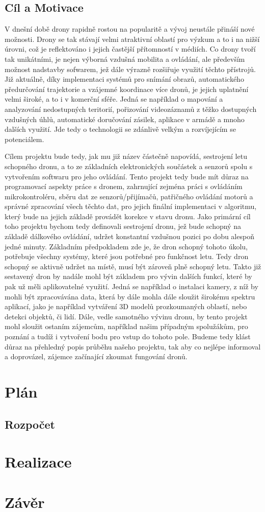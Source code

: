 \documentclass[12pt]{report}
\begin{document}
\section{Cíl a Motivace}
V dnešní době drony rapidně rostou na popularitě a vývoj neustále přináší nové možnosti. Drony se tak stávají velmi atraktivní oblastí pro výzkum a to i na nižší úrovni, což je reflektováno i jejich častější přítomností v médiích. Co drony tvoří tak unikátními, je nejen výborná vzdušná mobilita a ovládání, ale především možnost nadstavby sofwarem, jež dále výrazně rozšiřuje využití těchto přístrojů. Již aktuálně, díky implementaci systémů pro snímání obrazů, automatického předurčování trajektorie a vzájemné koordinace více dronů, je jejich uplatnění velmi široké, a to i v komerční sféře. Jedná se například o mapování a analyzování nedostupných teritorií, pořizování videozáznamů z těžko dostupných vzdušných úhlů, automatické doručování zásilek, aplikace v armádě a mnoho dalších využití. Jde tedy o technologii se zdánlivě velkým a rozvíjejícím se potenciálem.  \par 
Cílem projektu bude tedy, jak mu již název částečně napovídá, sestrojení letu schopného dronu, a to ze základních elektronických součástek a senzorů spolu s vytvořením softwaru pro jeho ovládání. Tento projekt tedy bude mít důraz na programovací aspekty práce s dronem, zahrnující zejména práci s ovládáním mikrokontroléru, sběru dat ze senzorů/přijímačů, patřičného ovládání motorů a správné zpracování všech těchto dat, pro jejich finální implementaci v algoritmu, který bude na jejich základě provádět korekce v stavu dronu. Jako primární cíl toho projektu bychom tedy definovali sestrojení dronu, jež bude schopný na základě dálkového ovládání, udržet konstantní vzdušnou pozici po dobu alespoň jedné minuty. Základním předpokladem zde je, že dron schopný tohoto úkolu, potřebuje všechny systémy, které jsou potřebné pro funkčnost letu. Tedy dron schopný se aktivně udržet na místě, musí být zároveň plně schopný letu. Takto již sestavený dron by nadále mohl být základem pro vývin dalších funkcí, které by pak už měli aplikovatelné využití. Jedná se například o instalaci kamery, z níž by mohli být zpracovávána data, která by dále mohla dále sloužit širokému spektru aplikací, jako je například vytváření 3D modelů prozkoumaných oblastí, nebo detekci objektů, či lidí. Dále, vedle samotného vývinu dronu, by tento projekt mohl sloužit ostaním zájemcům, například našim případným spolužákům, pro poznání a tudíž i vytvoření bodu pro vstup do tohoto pole. Budeme tedy klást důraz na přehledný popis průběhu našeho projektu, tak aby co nejlépe informoval a doprovázel, zájemce začínající zkoumat fungování dronů.

\chapter{Plán}
\section{Rozpočet}

\chapter{Realizace}

\chapter{Závěr}
\end{document}
